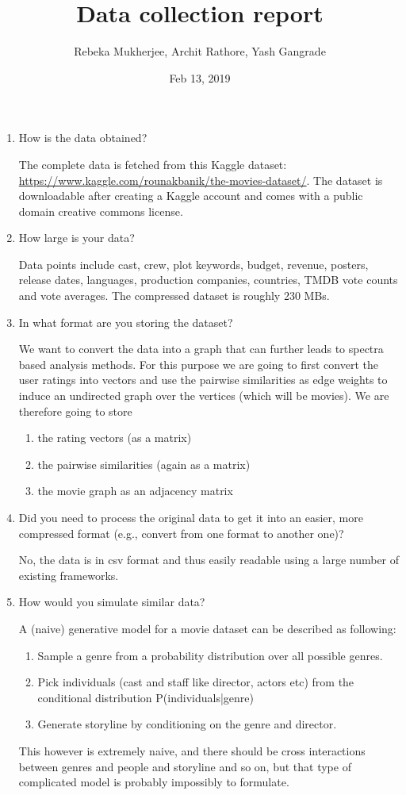 \documentclass[11pt]{article}
\title{Data collection report}
\author{Rebeka Mukherjee, Archit Rathore, Yash Gangrade}
\date{Feb 13, 2019}
\begin{document}
\maketitle

\begin{enumerate}

\item How is the data obtained?

The complete data is fetched from this Kaggle dataset: \url{https://www.kaggle.com/rounakbanik/the-movies-dataset/}. The dataset is downloadable after creating a Kaggle account and comes with a public domain creative commons license.

\item How large is your data?

Data points include cast, crew, plot keywords, budget, revenue, posters, release dates, languages, production companies, countries, TMDB vote counts and vote averages. The compressed dataset is roughly 230 MBs.

\item In what format are you storing the dataset?

We want to convert the data into a graph that can further leads to spectra based analysis methods. For this purpose we are going to first convert the user ratings into vectors and use the pairwise similarities as edge weights to induce an undirected graph over the vertices (which will be movies). We are therefore going to store
\begin{enumerate}
	\item the rating vectors (as a matrix)
	\item the pairwise similarities (again as a matrix)
	\item the movie graph as an adjacency matrix
\end{enumerate}

\item Did you need to process the original data to get it into an easier, more compressed format (e.g., convert from one format to another one)?

No, the data is in csv format and thus easily readable using a large number of existing frameworks.

\item How would you simulate similar data?

A (naive) generative model for a movie dataset can be described as following:
	\begin{enumerate}
		\item Sample a genre from a probability distribution over all possible genres.
		\item Pick individuals (cast and staff like director, actors etc) from the conditional distribution P(individuals|genre)
		\item Generate storyline by conditioning on the genre and director.
	\end{enumerate}
This however is extremely naive, and there should be cross interactions between genres and people and storyline and so on, but that type of complicated model is probably impossibly to formulate.
\end{enumerate}
\end{document}
